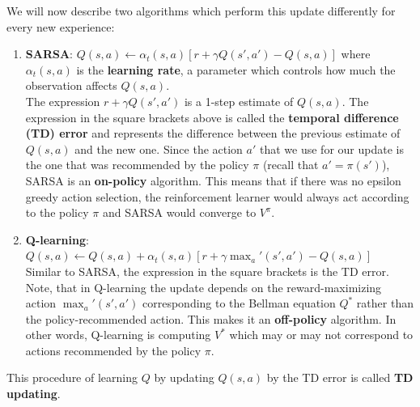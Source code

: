 We will now describe two algorithms which perform this update differently for every new experience:
\begin{enumerate}
    \item \textbf{SARSA}: $Q(s, a) \leftarrow \alpha_t(s, a)[r + \gamma Q(s', a') - Q(s, a)]$ where $\alpha_t(s, a)$ is the \textbf{learning rate}, a parameter which controls how much the observation affects $Q(s, a)$.\\
    The expression $r + \gamma Q(s', a')$ is a 1-step estimate of $Q(s, a)$. The expression in the square brackets above is called the \textbf{temporal difference (TD) error} and represents the difference between the previous estimate of $Q(s, a)$ and the new one. Since the action $a'$ that we use for our update is the one that was recommended by the policy $\pi$ (recall that $a' = \pi(s')$), SARSA is an \textbf{on-policy} algorithm. This means that if there was no epsilon greedy action selection, the reinforcement learner would always act according to the policy $\pi$ and SARSA would converge to $V^{\pi}$.
    \item \textbf{Q-learning}: $Q(s, a) \leftarrow Q(s, a) + \alpha_t(s, a)[r + \gamma\max_a'(s', a') - Q(s, a)]$\\
    Similar to SARSA, the expression in the square brackets is the TD error. Note, that in Q-learning the update depends on the reward-maximizing action $\max_a'(s', a')$ corresponding to the Bellman equation $Q^*$ rather than the policy-recommended action. This makes it an \textbf{off-policy} algorithm. In other words, Q-learning is computing $V^{*}$ which may or may not correspond to actions recommended by the policy $\pi$.
\end{enumerate}
This procedure of learning $Q$ by updating $Q(s, a)$ by the TD error is called \textbf{TD updating}.
